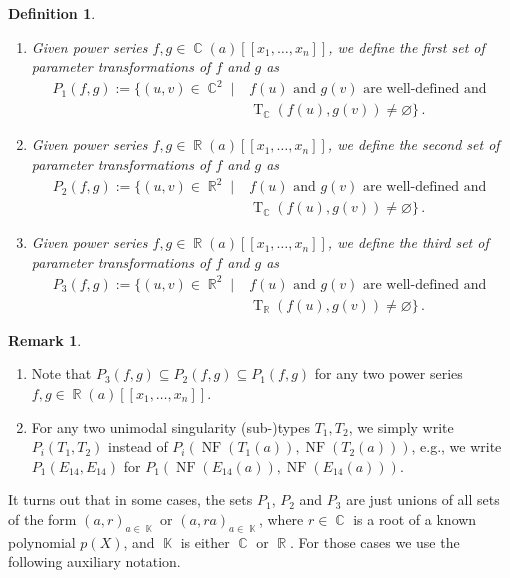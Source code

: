 \documentclass[noend]{amsproc}
\newtheorem{defn}[theorem]{Definition}
\theoremstyle{definition}
\newtheorem{remark}[theorem]{Remark}
\newcommand{\NF}[1]{\operatorname{NF}(#1)}
\DeclareMathOperator{\R}{\mathbb{R}}
\DeclareMathOperator{\C}{\mathbb{C}}
\DeclareMathOperator{\K}{\mathbb{K}}
\DeclareMathOperator{\T}{T}
\begin{document}
\begin{defn}
\phantom{X}\hfill
\begin{enumerate}
\item
Given power series $f,g \in \C(a)[[x_1,\ldots,x_n]]$, we define the
first set of parameter transformations of $f$ and $g$ as
\begin{align*}
P_1(f, g)
:= \{ (u, v) \in \C^2 \mid
&f(u) \text{ and } g(v) \text{ are well-defined and } \\
&\T_{\C}(f(u), g(v)) \neq \varnothing \} \,.
\end{align*}

\item
Given power series $f,g \in \R(a)[[x_1,\ldots,x_n]]$, we define the
second set of parameter transformations of $f$ and $g$ as
\begin{align*}
P_2(f, g)
:= \{ (u, v) \in \R^2 \mid
&f(u) \text{ and } g(v) \text{ are well-defined and } \\
&\T_{\C}(f(u), g(v)) \neq \varnothing \} \,.
\end{align*}

\item
Given power series $f,g \in \R(a)[[x_1,\ldots,x_n]]$, we define the
third set of parameter transformations of $f$ and $g$ as
\begin{align*}
P_3(f, g)
:= \{ (u, v) \in \R^2 \mid
&f(u) \text{ and } g(v) \text{ are well-defined and } \\
&\T_{\R}(f(u), g(v)) \neq \varnothing \} \,.
\end{align*}
\end{enumerate}
\end{defn}

\begin{remark}
\phantom{X}\hfill
\begin{enumerate}
\item
Note that $P_3(f, g) \subseteq P_2(f, g) \subseteq P_1(f, g)$ for any two power
series $f,g \in \R(a)[[x_1,\ldots,x_n]]$.

\item
For any two unimodal singularity (sub-)types $T_1, T_2$, we simply write
$P_i(T_1,T_2)$ instead of $P_i(\NF{T_1(a)}, \NF{T_2(a)})$, e.g., we write
$P_1(E_{14}, E_{14})$ for $P_1(\NF{E_{14}(a)}, \NF{E_{14}(a)})$.
\end{enumerate}
\end{remark}

It turns out that in some cases, the sets $P_1$, $P_2$ and $P_3$ are just
unions of all sets of the form $(a,r)_{a \in \K}$ or $(a, ra)_{a \in \K}$, where $r \in \C$ is a root of a known polynomial $p(X)$, and $\K$ is
either $\C$ or $\R$. For those cases we use the following auxiliary notation.
\end{document}
